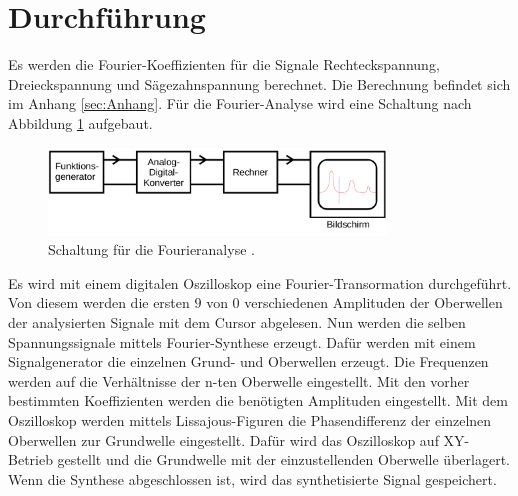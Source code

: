 \section{Durchführung}
\label{sec:Durchführung}
Es werden die Fourier-Koeffizienten für die Signale Rechteckspannung,
Dreieckspannung und Sägezahnspannung berechnet. Die Berechnung befindet sich im
Anhang \ref{sec:Anhang}.
Für die Fourier-Analyse wird eine Schaltung nach Abbildung \ref{fig:Analyseschaltung} aufgebaut.
\begin{figure}
  \centering
  \includegraphics[width=0.8\textwidth]{Analyseschaltung.png}
  \caption{Schaltung für die Fourieranalyse \cite{sample}.}
  \label{fig:Analyseschaltung}
\end{figure}
Es wird mit einem digitalen Oszilloskop eine Fourier-Transormation durchgeführt.
Von diesem werden die ersten $9$ von $0$ verschiedenen Amplituden der Oberwellen
der analysierten Signale mit dem Cursor abgelesen.
Nun werden die selben Spannungssignale mittels Fourier-Synthese erzeugt. Dafür
werden mit einem Signalgenerator die einzelnen Grund- und Oberwellen erzeugt. Die
Frequenzen werden auf die Verhältnisse der n-ten Oberwelle eingestellt.
Mit den vorher bestimmten Koeffizienten werden die benötigten Amplituden
eingestellt. Mit dem Oszilloskop werden mittels Lissajous-Figuren die
Phasendifferenz der einzelnen Oberwellen zur Grundwelle eingestellt. Dafür wird das Oszilloskop
auf XY-Betrieb gestellt und die Grundwelle mit der einzustellenden Oberwelle
überlagert. Wenn die Synthese abgeschlossen ist, wird das synthetisierte Signal
gespeichert.
